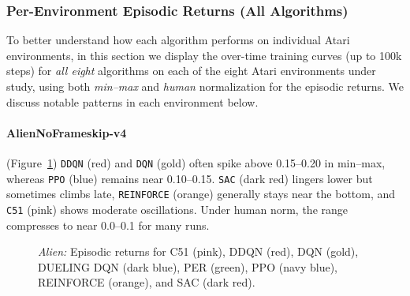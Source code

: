 \subsubsection{Per-Environment Episodic Returns (All Algorithms)}
\label{sssec:per_env_all}

To better understand how each algorithm performs on individual Atari environments,
in this section we display the over-time training curves (up to 100k steps) for 
\emph{all eight} algorithms on each of the eight Atari environments under study, 
using both \textit{min--max} and \textit{human} normalization for the episodic returns. 
We discuss notable patterns in each environment below.

\paragraph{AlienNoFrameskip-v4}
(Figure~\ref{fig:alien_comparison_combined})
\texttt{DDQN} (red) and \texttt{DQN} (gold) often spike above 0.15--0.20 in min--max, 
whereas \texttt{PPO} (blue) remains near 0.10--0.15. 
\texttt{SAC} (dark red) lingers lower but sometimes climbs late, 
\texttt{REINFORCE} (orange) generally stays near the bottom, and \texttt{C51} (pink) 
shows moderate oscillations. 
Under human norm, the range compresses to near 0.0--0.1 for many runs.

\begin{figure} 
	\centering
	\quad
	\caption{\emph{Alien:} Episodic returns for C51 (pink), DDQN (red), 
		DQN (gold), DUELING DQN (dark blue), PER (green),
		PPO (navy blue), REINFORCE (orange), and SAC (dark red).}
	\label{fig:alien_comparison_combined}
\end{figure}

